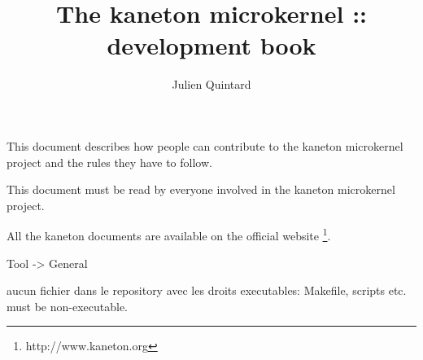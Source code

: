 %
%
%
%
%
%

%
%

\def\path{../..}

%
%



%
%

\rhead{}

%
%

\title{The kaneton microkernel :: development book
       \logos}

%
%

\author{\small{Julien Quintard}}

%
%



%
%

\maketitle

%
%

This document describes how people can contribute to the kaneton microkernel
project and the rules they have to follow.

This document must be read by everyone involved in the kaneton microkernel
project.

All the kaneton documents are available on
the official website
  \footnote{http://www.kaneton.org}.

%
%

\tableofcontents

%
%











%
%

Tool -> General

aucun fichier dans le repository avec les droits executables: Makefile,
scripts etc. must be non-executable.

